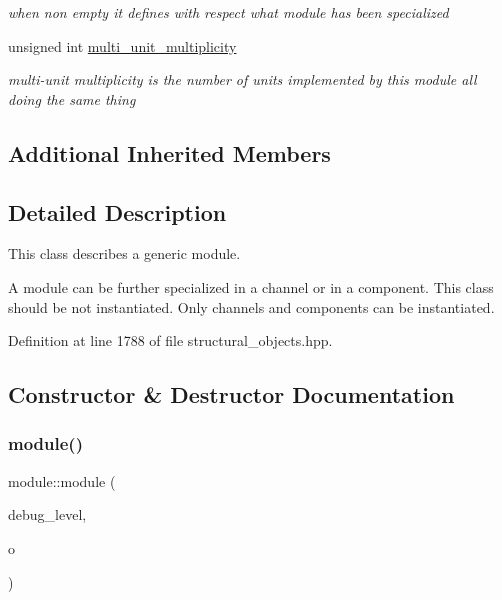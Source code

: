 \begin{DoxyCompactItemize}
\begin{DoxyCompactList}\small\item\em when non empty it defines with respect what module has been specialized \end{DoxyCompactList}\item 
unsigned int \hyperlink{classmodule_ac0faccd6dc63796440930ecd8dcb55a0}{multi\+\_\+unit\+\_\+multiplicity}
\begin{DoxyCompactList}\small\item\em multi-\/unit multiplicity is the number of units implemented by this module all doing the same thing \end{DoxyCompactList}\end{DoxyCompactItemize}
\subsection*{Additional Inherited Members}


\subsection{Detailed Description}
This class describes a generic module. 

A module can be further specialized in a channel or in a component. This class should be not instantiated. Only channels and components can be instantiated. 

Definition at line 1788 of file structural\+\_\+objects.\+hpp.



\subsection{Constructor \& Destructor Documentation}
\mbox{\label{classmodule_ab953ed86706d8e75b11d03f91094fe56}} 
\subsubsection{\texorpdfstring{module()}{module()}}
{\footnotesize\ttfamily module\+::module (\begin{DoxyParamCaption}\item[{int}]{debug\+\_\+level,  }\item[{const \hyperlink{structural__objects_8hpp_a8ea5f8cc50ab8f4c31e2751074ff60b2}{structural\+\_\+object\+Ref}}]{o }\end{DoxyParamCaption})}



